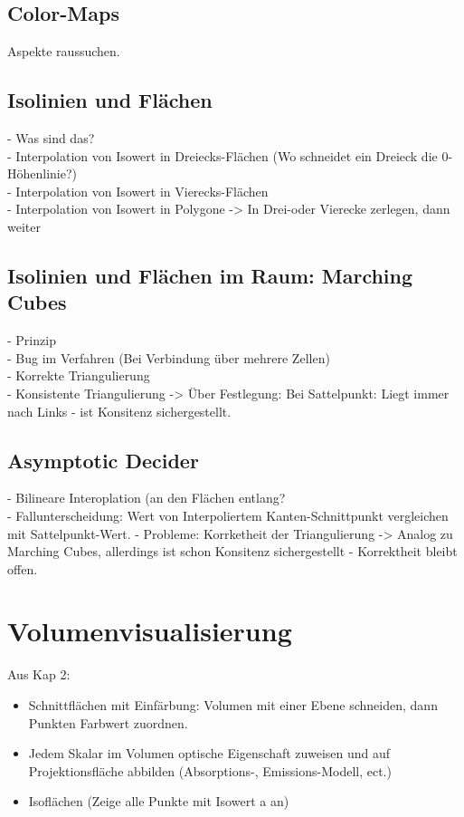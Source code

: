 \documentclass{article}
\begin{document}
\subsection{Color-Maps}
Aspekte raussuchen.

\subsection{Isolinien und Flächen}
- Was sind das?\\
- Interpolation von Isowert in Dreiecks-Flächen (Wo schneidet ein Dreieck die 0-Höhenlinie?)\\
- Interpolation von Isowert in Vierecks-Flächen\\
- Interpolation von Isowert in Polygone -> In Drei-oder Vierecke zerlegen, dann weiter\\

\subsection{Isolinien und Flächen im Raum: Marching Cubes}
- Prinzip\\
- Bug im Verfahren (Bei Verbindung über mehrere Zellen)\\
- Korrekte Triangulierung\\ 
- Konsistente Triangulierung -> Über Festlegung: Bei Sattelpunkt: Liegt immer nach Links - ist Konsitenz sichergestellt.

\subsection{Asymptotic Decider}
- Bilineare Interoplation (an den Flächen entlang?\\
- Fallunterscheidung: Wert von Interpoliertem Kanten-Schnittpunkt vergleichen mit Sattelpunkt-Wert.
- Probleme: Korrketheit der Triangulierung -> Analog zu Marching Cubes, allerdings ist schon Konsitenz sichergestellt - Korrektheit bleibt offen.\\

\pagebreak
\section{Volumenvisualisierung}
Aus Kap 2:
\begin{itemize}[noitemsep]
	\item Schnittflächen mit Einfärbung: Volumen mit einer Ebene schneiden, dann Punkten Farbwert zuordnen.
	\item Jedem Skalar im Volumen optische Eigenschaft zuweisen und auf Projektionsfläche abbilden (Absorptions-, Emissions-Modell, ect.)
	\item Isoflächen (Zeige alle Punkte mit Isowert a an)
\end{itemize}
\end{document}
